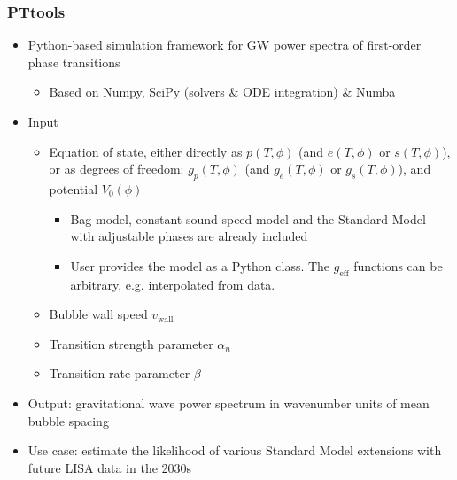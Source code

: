 \begin{frame}
    \frametitle{PTtools}
    \begin{itemize}
        \item Python-based simulation framework for GW power spectra of first-order phase transitions
        \begin{itemize}
            \item Based on Numpy, SciPy (solvers \& ODE integration) \& Numba
        \end{itemize}
        \item Input
        \begin{itemize}
            \item Equation of state, either directly as $p(T,\phi)$ (and $e(T,\phi)$ or $s(T,\phi)$),
                or as degrees of freedom: $g_p(T,\phi)$ (and $g_e(T,\phi)$ or $g_s(T,\phi)$), and potential $V_0(\phi)$
            \begin{itemize}
                \item Bag model, constant sound speed model and the Standard Model with adjustable phases are already included
                \item User provides the model as a Python class. The $g_\text{eff}$ functions can be arbitrary, e.g. interpolated from data.
            \end{itemize}
            \item Bubble wall speed $v_\text{wall}$
            \item Transition strength parameter $\alpha_n$
            \item Transition rate parameter $\beta$
        \end{itemize}
        \item Output: gravitational wave power spectrum in wavenumber units of mean bubble spacing
        \item Use case: estimate the likelihood of various Standard Model extensions with future LISA data in the 2030s
    \end{itemize}
\end{frame}

